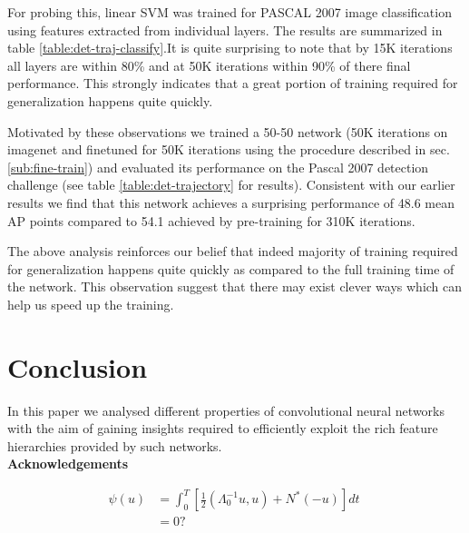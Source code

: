 \documentclass[runningheads]{llncs}
\begin{document}
For probing this, linear SVM was trained for PASCAL 2007 image classification using features extracted from individual layers. The results are summarized in table \ref{table:det-traj-classify}.It is quite surprising to note that by 15K iterations all layers are within 80\% and at 50K iterations within 90\% of there final performance. This strongly indicates that a great portion of training required for generalization happens quite quickly. 

Motivated by these observations we trained a 50-50 network (50K iterations on imagenet and finetuned for 50K iterations using the procedure described in sec. \ref{sub:fine-train}) and evaluated its performance on the  Pascal 2007 detection challenge (see table \ref{table:det-trajectory} for results). Consistent with our earlier results we find that this network achieves a surprising performance of 48.6 mean AP points compared to 54.1 achieved by pre-training for 310K iterations. 

\setlength{\tabcolsep}{1pt}
\begin{table}[t!]
\begin{center}
\caption{Performance of 50-50 network for detection on pascal-voc-2007 challenge. (l5 is conv-5 and l7 is fc-7)}
\label{table:det-trajectory}
\end{center}
\end{table}
\setlength{\tabcolsep}{1.4pt}
The above analysis reinforces our belief that indeed majority of training required for generalization happens quite quickly as compared to the full training time of the network. This observation suggest that there may exist clever ways which can help us speed up the training.



\section{Conclusion}
\label{sec:conclusion}
In this paper we analysed different properties of convolutional neural networks with the aim of gaining insights required to efficiently exploit the rich feature hierarchies provided by such networks. \\

\noindent \textbf{Acknowledgements}

\begin{align}
  \psi (u) & = \int_{0}^{T} \left[\frac{1}{2}
  \left(\Lambda_{0}^{-1} u,u\right) + N^{\ast} (-u)\right] dt \; \\
& = 0 ?
\end{align}




\end{document}
